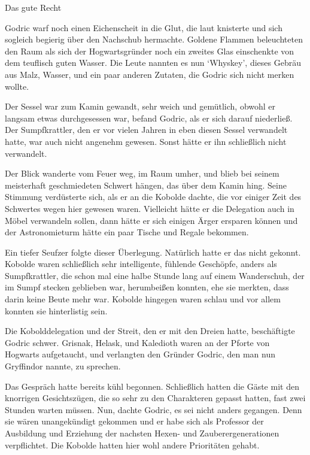 \documentclass[fontsize=12pt]{scrartcl}
\begin{document}
	{\huge  Das gute Recht}
	\vspace{15pt}
	
	{\LARGE G}odric warf noch einen Eichenscheit in die Glut, die laut knisterte und sich sogleich begierig über den Nachschub hermachte. Goldene Flammen beleuchteten den Raum als sich der Hogwartsgründer noch ein zweites Glas einschenkte von dem teuflisch guten Wasser. Die Leute nannten es nun \lq Whyskey\rq, dieses Gebräu aus Malz, Wasser, und ein paar anderen Zutaten, die Godric sich nicht merken wollte.
	
	Der Sessel war zum Kamin gewandt, sehr weich und gemütlich, obwohl er langsam etwas durchgesessen war, befand Godric, als er sich darauf niederließ. Der Sumpfkrattler, den er vor vielen Jahren in eben diesen Sessel verwandelt hatte, war auch nicht angenehm gewesen. Sonst hätte er ihn schließlich nicht verwandelt.
	
	Der Blick wanderte vom Feuer weg, im Raum umher, und blieb bei seinem meisterhaft geschmiedeten Schwert hängen, das über dem Kamin hing. Seine Stimmung verdüsterte sich, als er an die Kobolde dachte, die vor einiger Zeit des Schwertes wegen hier gewesen waren. Vielleicht hätte er die Delegation auch in Möbel verwandeln sollen, dann hätte er sich einigen Ärger ersparen können und der Astronomieturm hätte ein paar Tische und Regale bekommen.  
	
	Ein tiefer Seufzer folgte dieser Überlegung. Natürlich hatte er das nicht gekonnt. Kobolde waren schließlich sehr intelligente, fühlende Geschöpfe, anders als Sumpfkrattler, die schon mal eine halbe Stunde lang auf einem Wanderschuh, der im Sumpf stecken geblieben war, herumbeißen konnten, ehe sie merkten, dass darin keine Beute mehr war. Kobolde hingegen waren schlau und vor allem konnten sie hinterlistig sein. 
	
	Die Kobolddelegation und der Streit, den er mit den Dreien hatte, beschäftigte Godric schwer. Grisnak, Helask, und Kaledioth waren an der Pforte von Hogwarts aufgetaucht, und verlangten den Gründer Godric, den man nun Gryffindor nannte, zu sprechen. 
	
	Das Gespräch hatte bereits kühl begonnen. Schließlich hatten die Gäste mit den knorrigen Gesichtszügen, die so sehr zu den Charakteren gepasst hatten, fast zwei Stunden warten müssen. Nun, dachte Godric, es sei nicht anders gegangen. Denn sie wären unangekündigt gekommen und er habe sich als Professor der Ausbildung und Erziehung der nachsten Hexen- und Zauberergenerationen verpflichtet. Die Kobolde hatten hier wohl andere Prioritäten gehabt.
	
\end{document}

